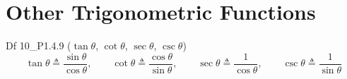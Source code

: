 \documentclass{article}
\begin{document}
\section{Other Trigonometric Functions}

\begin{Df}{Df 10\_P1.4.9 ($\tan \theta$, $\cot \theta$, $\sec \theta$, $\csc \theta$)}
    $$ \tan \theta \triangleq \frac{\sin \theta}{\cos \theta}, \qquad \cot \theta \triangleq \frac{\cos \theta}{\sin \theta}, \qquad \sec \theta \triangleq \frac{1}{\cos \theta}, \qquad \csc \theta \triangleq \frac{1}{\sin \theta} $$
\end{Df}
\end{document}
